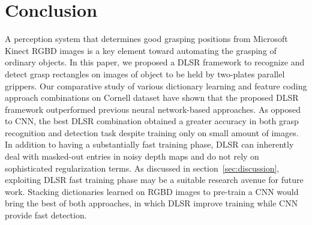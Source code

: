 \documentclass[svgnames]{scrartcl}
\begin{document}
\section{Conclusion}
\label{sec:conclusion}


A perception system that determines good grasping positions from Microsoft Kinect RGBD images is a key element toward automating the grasping of ordinary objects. In this paper, we proposed a DLSR framework to recognize and detect grasp rectangles on images of object to be held by two-plates parallel grippers. Our comparative study of various dictionary learning and feature coding approach combinations on Cornell dataset have shown that the proposed DLSR framework outperformed previous neural network-based approaches. As opposed to CNN, the best DLSR combination obtained a greater accuracy in both grasp recognition and detection task despite training only on small amount of images. In addition to having a substantially fast training phase, DLSR can inherently deal with masked-out entries in noisy depth maps and do not rely on sophisticated regularization terms. As discussed in section~\ref{sec:discussion}, exploiting DLSR fast training phase may be a suitable research avenue for future work. Stacking dictionaries learned on RGBD images to pre-train a CNN would bring the best of both approaches, in which DLSR improve training while CNN provide fast detection.


\setlength{\bibsep}{4pt plus 0.3ex}

{\small

}
\end{document}
